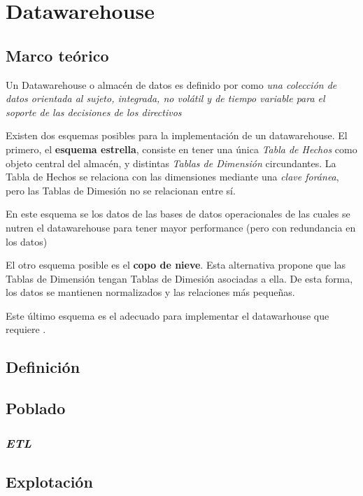 \section{Datawarehouse}

\subsection{Marco teórico}

Un Datawarehouse o almacén de datos es definido por \autocite{elmasri-dw} como \emph{una colección de datos orientada al sujeto, integrada, no volátil y de tiempo variable para el soporte de las decisiones de los directivos} 

Existen dos esquemas posibles para la implementación de un datawarehouse. El primero, el \textbf{esquema estrella}, consiste en tener una única \emph{Tabla de Hechos} como objeto central del almacén, y distintas \emph{Tablas de Dimensión} circundantes. La Tabla de Hechos se relaciona con las dimensiones mediante una \emph{clave foránea}, pero las Tablas de Dimesión no se relacionan entre sí.

En este esquema se  los datos de las bases de datos operacionales de las cuales se nutren el datawarehouse para tener mayor performance (pero con redundancia en los datos)

El otro esquema posible es el \textbf{copo de nieve}. Esta alternativa propone que las Tablas de Dimensión tengan Tablas de Dimesión asociadas a ella. De esta forma, los datos se mantienen normalizados y las relaciones más pequeñas.

Este último esquema es el adecuado para implementar el datawarhouse que requiere .

\subsection{Definición}

\subsection{Poblado}

\subsubsection{\emph{ETL}}


\subsection{Explotación}

